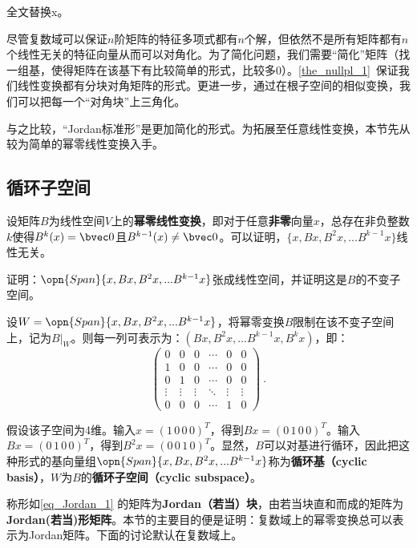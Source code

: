 

\begin{issues}
\issueDraft 全文替换x。
\end{issues}

尽管复数域可以保证$n$阶矩阵的特征多项式都有$n$个解，但依然不是所有矩阵都有$n$个线性无关的特征向量从而可以对角化。为了简化问题，我们需要“简化”矩阵（找一组基，使得矩阵在该基下有比较简单的形式，比较多$0$）。\autoref{the_nullpl_1}~保证我们线性变换都有分块对角矩阵的形式。更进一步，通过在根子空间的相似变换，我们可以把每一个“对角块”上三角化。

与之比较，“Jordan标准形”是更加简化的形式。为拓展至任意线性变换，本节先从较为简单的幂零线性变换入手。
\subsection{循环子空间}
设矩阵$B$为线性空间$V$上的\textbf{幂零线性变换}，即对于任意\textbf{非零}向量$x$，总存在非负整数$k$使得$B^{k}(x)=\bvec 0$且$B^{k-1}(x)\neq \bvec 0$。可以证明，$\{x,Bx,B^2x,...B^{k-1}x\}$线性无关。
\begin{exercise}{}
证明：$\opn{Span}\{x,Bx,B^2x,...B^{k-1}x\}$张成线性空间，并证明这是$B$的不变子空间。
\end{exercise}
设$W=\opn{Span}\{x,Bx,B^2x,...B^{k-1}x\}$，将幂零变换$B$限制在该不变子空间上，记为$B|_W$。则每一列可表示为：$(Bx,B^2x,...B^{k-1}x,B^kx)$，即：
\begin{equation}\label{eq_Jordan_1}
\left(\begin{array}{cccccc}
0 & 0 & 0 & \cdots & 0 & 0 \\
1 & 0 & 0 & \cdots & 0 & 0 \\
0 & 1 & 0 & \cdots & 0 & 0 \\
\vdots & \vdots & \vdots & \ddots & \vdots & \vdots \\
0 & 0 & 0 & \cdots & 1 & 0
\end{array}\right)~.
\end{equation}

假设该子空间为4维。输入$x=(1\,0\,0\,0)^T$，得到$Bx=(0\,1\,0\,0)^T$。输入$Bx=(0\,1\,0\,0)^T$，得到$B^2x=(0\,0\,1\,0)^T$。显然，$B$可以对基进行循环，因此把这种形式的基向量组$\opn{Span}\{x,Bx,B^2x,...B^{k-1}x\}$称为\textbf{循环基（cyclic basis）}，$W$为$B$的\textbf{循环子空间（cyclic subspace）}。

称形如\autoref{eq_Jordan_1} 的矩阵为\textbf{Jordan（若当）块}，由若当块直和而成的矩阵为\textbf{ Jordan(若当)形矩阵}。本节的主要目的便是证明：复数域上的幂零变换总可以表示为Jordan矩阵。下面的讨论默认在复数域上。


